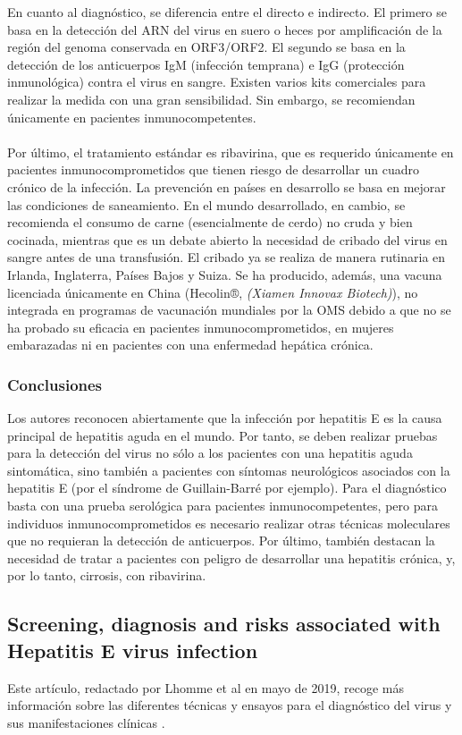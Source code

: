 \documentclass[11 pt]{article}
\begin{document}
En cuanto al diagnóstico, se diferencia entre el directo e indirecto. El primero se basa en la detección del ARN del virus en suero o heces por amplificación de la región del genoma conservada en ORF3/ORF2. El segundo se basa en la detección de los anticuerpos IgM (infección temprana) e IgG (protección inmunológica) contra el virus en sangre. Existen varios kits comerciales para realizar la medida con una gran sensibilidad. Sin embargo, se recomiendan únicamente en pacientes inmunocompetentes.\\\\
Por último, el tratamiento estándar es ribavirina, que es requerido únicamente en pacientes inmunocomprometidos que tienen riesgo de desarrollar un cuadro crónico de la infección. La prevención en países en desarrollo se basa en mejorar las condiciones de saneamiento. En el mundo desarrollado, en cambio, se recomienda el consumo de carne (esencialmente de cerdo) no cruda y bien cocinada, mientras que es un debate abierto la necesidad de cribado del virus en sangre antes de una transfusión. El cribado ya se realiza de manera rutinaria en Irlanda, Inglaterra, Países Bajos y Suiza. Se ha producido, además, una vacuna licenciada únicamente en China (Hecolin®, {\em (Xiamen Innovax Biotech)}), no integrada en programas de vacunación mundiales por la OMS debido a que no se ha probado su eficacia en pacientes inmunocomprometidos, en mujeres embarazadas ni en pacientes con una enfermedad hepática crónica. 
	
\subsubsection{Conclusiones}
Los autores reconocen abiertamente que la infección por hepatitis E es la causa principal de hepatitis aguda en el mundo. Por tanto, se deben realizar pruebas para la detección del virus no sólo a los pacientes con una hepatitis aguda sintomática, sino también a pacientes con síntomas neurológicos asociados con la hepatitis E (por el síndrome de Guillain-Barré por ejemplo). Para el diagnóstico basta con una prueba serológica para pacientes inmunocompetentes, pero para individuos inmunocomprometidos es necesario realizar otras técnicas moleculares que no requieran la detección de anticuerpos. Por último, también destacan la necesidad de tratar a pacientes con peligro de desarrollar una hepatitis crónica, y, por lo tanto, cirrosis, con ribavirina.

\subsection{Screening, diagnosis and risks associated with Hepatitis E virus infection}
Este artículo, redactado por Lhomme et al en mayo de 2019, recoge más información sobre las diferentes técnicas y ensayos para el diagnóstico del virus y sus manifestaciones clínicas \cite{Lhomme2019}.
\end{document}
